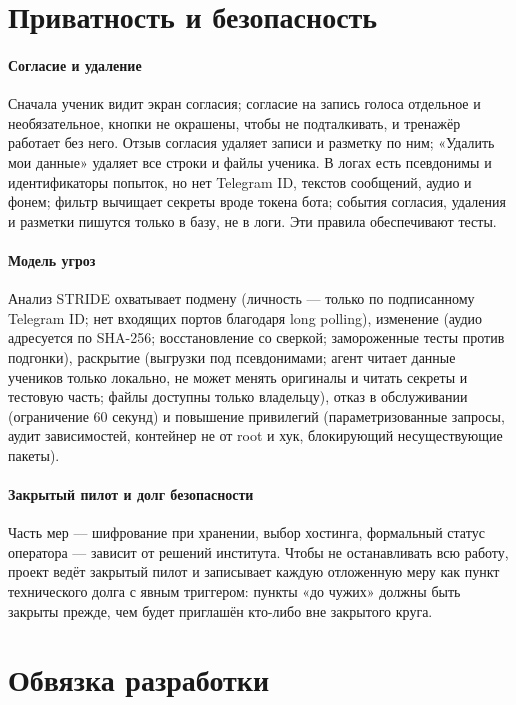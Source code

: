 \section{Приватность и безопасность}\label{sec:impl-privacy}

\paragraph{Согласие и удаление} Сначала ученик видит экран согласия; согласие на запись голоса отдельное и
необязательное, кнопки не окрашены, чтобы не подталкивать, и тренажёр работает без него. Отзыв согласия
удаляет записи и разметку по ним; «Удалить мои данные» удаляет все строки и файлы ученика. В логах есть
псевдонимы и идентификаторы попыток, но нет Telegram ID, текстов сообщений, аудио и фонем; фильтр
вычищает секреты вроде токена бота; события согласия, удаления и разметки пишутся только в базу, не в
логи. Эти правила обеспечивают тесты.

\paragraph{Модель угроз} Анализ STRIDE охватывает подмену (личность --- только по подписанному Telegram ID;
нет входящих портов благодаря long polling), изменение (аудио адресуется по SHA-256; восстановление со
сверкой; замороженные тесты против подгонки), раскрытие (выгрузки под псевдонимами; агент читает данные
учеников только локально, не может менять оригиналы и читать секреты и тестовую часть; файлы доступны только владельцу), отказ в обслуживании (ограничение
60 секунд) и повышение привилегий (параметризованные запросы, аудит зависимостей, контейнер не от root и
хук, блокирующий несуществующие пакеты).

\paragraph{Закрытый пилот и долг безопасности} Часть мер --- шифрование при хранении, выбор хостинга,
формальный статус оператора --- зависит от решений института. Чтобы не останавливать всю работу, проект
ведёт закрытый пилот и записывает каждую отложенную меру как пункт технического долга с явным
триггером: пункты «до чужих» должны быть закрыты прежде, чем будет приглашён кто-либо вне закрытого круга.

\section{Обвязка разработки}\label{sec:impl-harness}

